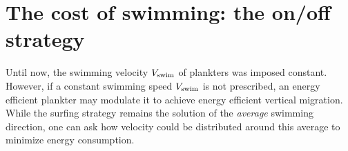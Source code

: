 % 

\section{The cost of swimming: the on/off strategy}\label{sec:on_off}

Until now, the swimming velocity $V_{\mathrm{swim}}$ of plankters was imposed constant. 
However, if a constant swimming speed $V_{\mathrm{swim}}$ is not prescribed, an energy efficient plankter may modulate it to achieve energy efficient vertical migration. 
While the surfing strategy remains the solution of the \textit{average} swimming direction, one can ask how velocity could be distributed around this average to minimize energy consumption.

